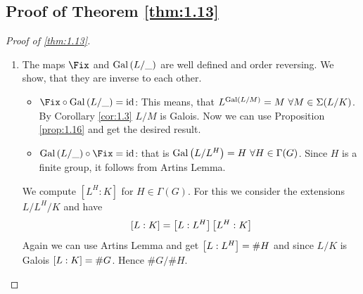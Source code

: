 \documentclass[twoside = false,	%
		headsepline,		%
		parskip = true,
		]{scrbook}						%
\begin{document}
        \subsection{Proof of Theorem \ref{thm:1.13}}
        \begin{proof}[Proof of \ref{thm:1.13}]
        \begin{enumerate}
            \item [(1)]
            The maps $\Fix$ and $\mathrm{Gal}\left( L/\_\right)$ are well defined and order reversing. We show, that they are inverse to each other.
            \begin{itemize}
                \item $\Fix\circ\Gal{L/\_}=\id$:
                This means, that $L^{\mathrm{Gal}\left( L/M\right)}=M\ \forall M\in\Sigma(L/K)$. By Corollary \ref{cor:1.3} $L/M$ is Galois. Now we can use Proposition \ref{prop:1.16} and get the desired result.
                \item $\Gal{L/\_}\circ\Fix=\id$: that is $\mathrm{Gal}\left( L/L^H\right)=H\ \forall H\in\Gamma(G)$. Since $H$ is a finite group, it follows from Artins Lemma.
            \end{itemize}
            We compute $[L^H:K]$ for $H\in\Gamma(G)$. For this we consider the extensions $L/L^H/K$ and have $$\left[ L:K\right]=\left[ L:L^H\right]\left[ L^H:K\right]$$
            Again we can use Artins Lemma and get $\left[ L:L^H\right]=\#H$ and since $L/K$ is Galois $\left[ L:K\right]=\#G$. Hence $\#G/\#H$.
            

\end{enumerate}
\end{proof}
\end{document}
